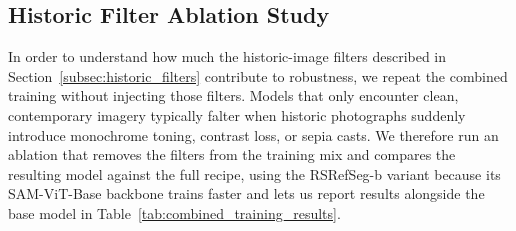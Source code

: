 \subsection{Historic Filter Ablation Study}
\label{subsec:historic_ablation}

In order to understand how much the historic-image filters described in Section~\ref{subsec:historic_filters} contribute to robustness, we repeat the combined training without injecting those filters. Models that only encounter clean, contemporary imagery typically falter when historic photographs suddenly introduce monochrome toning, contrast loss, or sepia casts. We therefore run an ablation that removes the filters from the training mix and compares the resulting model against the full recipe, using the RSRefSeg-b variant because its SAM-ViT-Base backbone trains faster and lets us report results alongside the base model in Table~\ref{tab:combined_training_results}.

